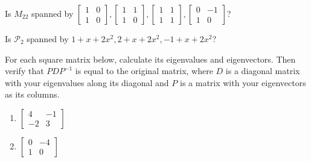 \documentclass[12pt,letterpaper]{hmcpset}
\newcommand{\m}[1]{\begin{bmatrix} #1 \end{bmatrix}}
\begin{document}
\begin{problem}[6.1.60]
    Is $M_{22}$ spanned by
    $\m{1&0\\1&0},\m{1&1\\1&0},\m{1&1\\1&1},\m{0&-1\\1&0}$?
\end{problem}
\begin{solution}
    \vfill
\end{solution}
\newpage

\begin{problem}[6.1.62]
    Is $\mathscr{P}_2$ spanned by $1+x+2x^2, 2+x+2x^2, -1+x+2x^2$?
\end{problem}
\begin{solution}
    \vfill
\end{solution}
\newpage

\begin{problem}
    For each square matrix below, calculate its eigenvalues and eigenvectors.
    Then verify that $PDP^{-1}$ is equal to the original matrix, where $D$ is a
    diagonal matrix with your eigenvalues along its diagonal and $P$ is a matrix
    with your eigenvectors as its columns.
    \begin{enumerate}
        \item $\m{4&-1\\-2&3}$
        \item $\m{0&-4\\1&0}$
    \end{enumerate}
\end{problem}
\begin{solution}
    \vfill
\end{solution}
\end{document}

